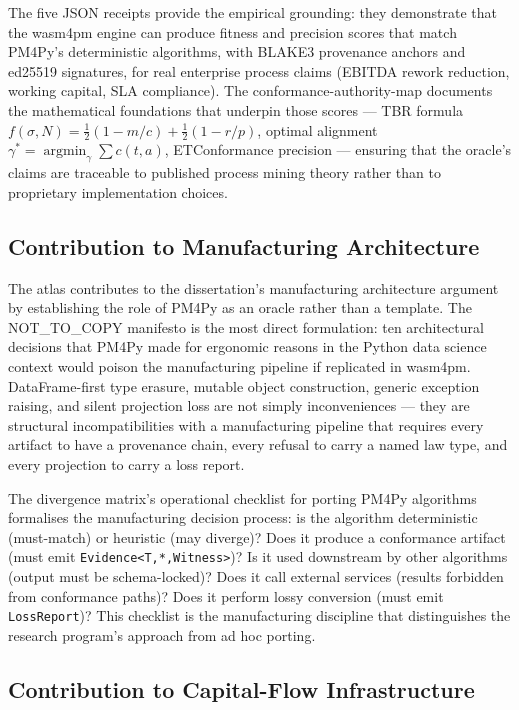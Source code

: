 The five JSON receipts provide the empirical grounding: they demonstrate that the
wasm4pm engine can produce fitness and precision scores that match PM4Py's deterministic
algorithms, with BLAKE3 provenance anchors and ed25519 signatures, for real enterprise
process claims (EBITDA rework reduction, working capital, SLA compliance). The
conformance-authority-map documents the mathematical foundations that underpin those
scores --- TBR formula $f(\sigma,N) = \tfrac{1}{2}(1-m/c)+\tfrac{1}{2}(1-r/p)$,
optimal alignment $\gamma^* = \operatorname{argmin}_\gamma \sum c(t,a)$, ETConformance
precision --- ensuring that the oracle's claims are traceable to published process mining
theory rather than to proprietary implementation choices.

\subsection{Contribution to Manufacturing Architecture}
\label{sec:sources-pm4py-contribution-manufacturing}

The atlas contributes to the dissertation's manufacturing architecture argument by
establishing the role of PM4Py as an oracle rather than a template. The NOT\_TO\_COPY
manifesto is the most direct formulation: ten architectural decisions that PM4Py made for
ergonomic reasons in the Python data science context would poison the manufacturing pipeline
if replicated in wasm4pm. DataFrame-first type erasure, mutable object construction,
generic exception raising, and silent projection loss are not simply inconveniences ---
they are structural incompatibilities with a manufacturing pipeline that requires every
artifact to have a provenance chain, every refusal to carry a named law type, and every
projection to carry a loss report.

The divergence matrix's operational checklist for porting PM4Py algorithms formalises
the manufacturing decision process: is the algorithm deterministic (must-match) or
heuristic (may diverge)? Does it produce a conformance artifact (must emit \texttt{Evidence<T,*,Witness>})?
Is it used downstream by other algorithms (output must be schema-locked)? Does it call
external services (results forbidden from conformance paths)? Does it perform lossy
conversion (must emit \texttt{LossReport})? This checklist is the manufacturing discipline
that distinguishes the research program's approach from ad hoc porting.

\subsection{Contribution to Capital-Flow Infrastructure}
\label{sec:sources-pm4py-contribution-capital}

